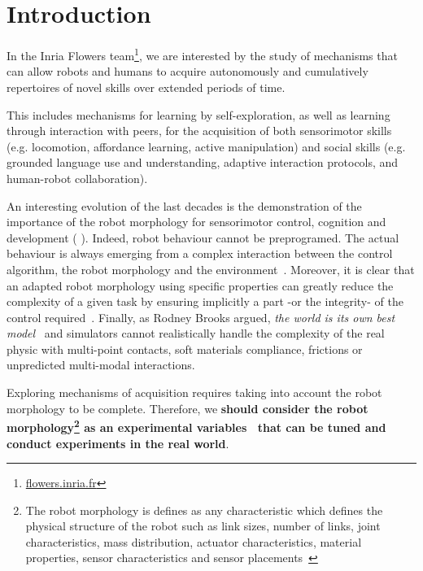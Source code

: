 
% 

\chapter{Introduction} %


In the Inria Flowers team\footnote{\url{flowers.inria.fr}}, we are interested by the study of mechanisms that can allow robots and humans to acquire autonomously and cumulatively repertoires of novel skills over extended periods of time.

This includes mechanisms for learning by self-exploration, as well as learning through interaction with peers, for the acquisition of both sensorimotor skills (e.g. locomotion, affordance learning, active manipulation) and social skills (e.g. grounded language use and understanding, adaptive interaction protocols, and human-robot collaboration).

An interesting evolution of the last decades is the demonstration of the importance of the robot morphology for sensorimotor control, cognition and development (\cite{kaplan2008corps} \cite{steels1995artificial} \cite{Pfeifer06}). Indeed, robot behaviour cannot be preprogramed. The actual behaviour is always emerging from a complex interaction between the control algorithm, the robot morphology and the environment~\cite{Steels1991emergence}. Moreover, it is clear that an adapted robot morphology using specific properties can greatly reduce the complexity of a given task by ensuring implicitly a part -or the integrity- of the control required~\cite{pfeifer2005morphological}.
Finally, as Rodney Brooks argued, \emph{the world is its own best model}~\cite{brooks1991intelligence} and simulators cannot realistically handle the complexity of the real physic with multi-point contacts, soft materials compliance, frictions or unpredicted multi-modal interactions.


Exploring mechanisms of acquisition requires taking into account the robot morphology to be complete.
Therefore, we \textbf{should consider the robot morphology\footnote{The robot morphology is defines as any characteristic which defines the physical structure of the robot such as link sizes, number of links, joint characteristics, mass distribution, actuator characteristics, material properties, sensor characteristics and sensor placements~\cite{paul2006morphological}} as an experimental variables~\cite{kaplan2008corps} that can be tuned and conduct experiments in the real world}.

